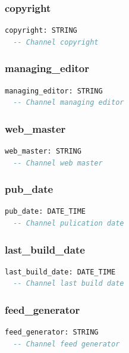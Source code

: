 \subsubsection{copyright}

\begin{lstlisting}[language=Eiffel]
copyright: STRING
  -- Channel copyright
\end{lstlisting}

\subsubsection{managing\_editor}

\begin{lstlisting}[language=Eiffel]
managing_editor: STRING
  -- Channel managing editor
\end{lstlisting}

\subsubsection{web\_master}

\begin{lstlisting}[language=Eiffel]
web_master: STRING
  -- Channel web master
\end{lstlisting}

\subsubsection{pub\_date}

\begin{lstlisting}[language=Eiffel]
pub_date: DATE_TIME
  -- Channel pulication date
\end{lstlisting}

\subsubsection{last\_build\_date}

\begin{lstlisting}[language=Eiffel]
last_build_date: DATE_TIME
  -- Channel last build date
\end{lstlisting}

\subsubsection{feed\_generator}

\begin{lstlisting}[language=Eiffel]
feed_generator: STRING
  -- Channel feed generator
\end{lstlisting}

